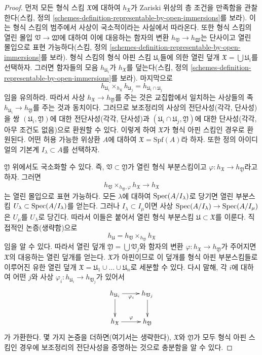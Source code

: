 \begin{proof}
먼저 모든 형식 스킴 $\mathfrak X$에 대하여 $h_\mathfrak X$가
Zariski 위상의 층 조건을 만족함을 관찰한다(스킴, 정의
\ref{schemes-definition-representable-by-open-immersions}를 보라).
이는 형식 스킴의 범주에서 사상이 국소적이라는 사실에서 따라온다.
또한 형식 스킴의 열린 몰입 $\mathfrak V \to \mathfrak W$에 대하여
이에 대응하는 함자의 변환 $h_\mathfrak V \to h_\mathfrak W$는
단사이고 열린 몰입으로 표현 가능하다(스킴, 정의
\ref{schemes-definition-representable-by-open-immersions}를 보라).
형식 스킴의 형식 아핀 스킴 $\mathfrak U_i$들에 의한 열린 덮개
$\mathfrak X = \bigcup \mathfrak U_i$를 선택하자. 그러면 함자들의
모음 $h_{\mathfrak U_i}$가 $h_\mathfrak X$를 덮는다(스킴, 정의
\ref{schemes-definition-representable-by-open-immersions}를 보라).
마지막으로
$$
h_{\mathfrak U_i} \times_{h_\mathfrak X} h_{\mathfrak U_j} =
h_{\mathfrak U_i \cap \mathfrak U_j}
$$
임을 유의하라. 따라서 사상 $h_\mathfrak X \to h_\mathfrak Y$를
주는 것은 교집합에서 일치하는 사상들의 족
$h_{\mathfrak U_i} \to h_\mathfrak Y$를 주는 것과 동치이다.
그러므로 보조정리의 사상의 전단사성(각각, 단사성)을 쌍
$(\mathfrak U_i, \mathfrak Y)$에 대한 전단사성(각각, 단사성)과
$(\mathfrak U_i \cap \mathfrak U_j, \mathfrak Y)$에 대한
단사성(각각, 아무 조건도 없음)으로 환원할 수 있다.
이렇게 하여 $\mathfrak X$가 형식 아핀 스킴인 경우로 환원된다.
어떤 허용 가능한 위상환 $A$에 대하여
$\mathfrak X = \text{Spf}(A)$라 하자. 또한 정의 아이디얼의 기본계
$I_\lambda \subset A$를 선택하자.

\medskip\noindent
$\mathfrak Y$ 위에서도 국소화할 수 있다. 즉,
$\mathfrak V \subset \mathfrak Y$가 열린 형식 부분스킴이고
$\varphi : h_\mathfrak X \to h_\mathfrak Y$라고 하자. 그러면
$$
h_\mathfrak V \times_{h_\mathfrak Y, \varphi} h_\mathfrak X \to h_\mathfrak X
$$
는 열린 몰입으로 표현 가능하다. 모든 $\lambda$에 대하여
$\mathop{\mathrm{Spec}}(A/I_\lambda)$로 당기면 열린 부분스킴
$U_\lambda \subset \mathop{\mathrm{Spec}}(A/I_\lambda)$를 얻는다. 그러나
$I_\lambda \subset I_\mu$이면 사상
$\mathop{\mathrm{Spec}}(A/I_\lambda) \to \mathop{\mathrm{Spec}}(A/I_\mu)$은 $U_\mu$를
$U_\lambda$로 당긴다. 따라서 이들은 붙어서 열린 형식 부분스킴
$\mathfrak U \subset \mathfrak X$를 이룬다.
직접적인 논증(생략함)으로
$$
h_\mathfrak U = h_\mathfrak V \times_{h_\mathfrak Y} h_\mathfrak X
$$
임을 알 수 있다. 따라서 열린 덮개
$\mathfrak Y = \bigcup \mathfrak V_j$와 함자의 변환
$\varphi :  h_\mathfrak X \to h_\mathfrak Y$가 주어지면
$\mathfrak X$의 대응하는 열린 덮개를 얻는다.
$\mathfrak X$가 아핀이므로 이 덮개를 형식 아핀 부분스킴들로 이루어진
유한 열린 덮개
$\mathfrak X = \mathfrak U_1 \cup \ldots \cup \mathfrak U_n$로
세분할 수 있다. 다시 말해, 각 $i$에 대하여 어떤 $j$와 사상
$\varphi_i : h_{\mathfrak U_i} \to h_{\mathfrak V_j}$가 있어서
$$
\xymatrix{
h_{\mathfrak U_i} \ar[r]_{\varphi_i} \ar[d] & h_{\mathfrak V_j} \ar[d] \\
h_{\mathfrak X} \ar[r]^\varphi & h_\mathfrak Y
}
$$
가 가환한다. 몇 가지 논증을 더하면(여기서는 생략한다),
$\mathfrak X$와 $\mathfrak Y$가 모두 형식 아핀 스킴인 경우에
보조정리의 전단사성을 증명하는 것으로 충분함을 알 수 있다.


\end{proof}

